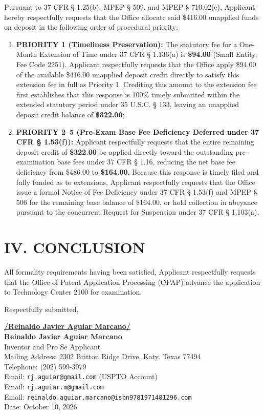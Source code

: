 \documentclass[11pt,letterpaper]{article}
\begin{document}
Pursuant to 37 CFR \S{} 1.25(b), MPEP \S{} 509, and MPEP \S{} 710.02(e), Applicant hereby respectfully requests that the Office allocate said \$416.00 unapplied funds on deposit in the following order of procedural priority:
\begin{enumerate}[leftmargin=*]
    \item \textbf{PRIORITY 1 (Timeliness Preservation):} The statutory fee for a One-Month Extension of Time under 37 CFR \S{} 1.136(a) is \textbf{\$94.00} (Small Entity, Fee Code 2251). Applicant respectfully requests that the Office apply \$94.00 of the available \$416.00 unapplied deposit credit directly to satisfy this extension fee in full as Priority 1. Crediting this amount to the extension fee first establishes that this response is 100\% timely submitted within the extended statutory period under 35 U.S.C. \S{} 133, leaving an unapplied deposit credit balance of \textbf{\$322.00};
    \item \textbf{PRIORITY 2--5 (Pre-Exam Base Fee Deficiency Deferred under 37 CFR \S{} 1.53(f)):} Applicant respectfully requests that the entire remaining deposit credit of \textbf{\$322.00} be applied directly toward the outstanding pre-examination base fees under 37 CFR \S{} 1.16, reducing the net base fee deficiency from \$486.00 to \textbf{\$164.00}. Because this response is timely filed and fully funded as to extensions, Applicant respectfully requests that the Office issue a formal Notice of Fee Deficiency under 37 CFR \S{} 1.53(f) and MPEP \S{} 506 for the remaining base balance of \$164.00, or hold collection in abeyance pursuant to the concurrent Request for Suspension under 37 CFR \S{} 1.103(a).
\end{enumerate}

\section*{IV. CONCLUSION}

All formality requirements having been satisfied, Applicant respectfully requests that the Office of Patent Application Processing (OPAP) advance the application to Technology Center 2100 for examination.

\vspace{0.6cm}
\begin{singlespace}
\noindent Respectfully submitted, \par\vspace{0.8cm}
\underline{\textbf{/Reinaldo Javier Aguiar Marcano/}} \\
\textbf{Reinaldo Javier Aguiar Marcano} \\
Inventor and Pro Se Applicant \\
Mailing Address: 2302 Britton Ridge Drive, Katy, Texas 77494 \\
Telephone: (202) 599-3979 \\
Email: \texttt{rj.aguiar@gmail.com} (USPTO Account) \\
Email: \texttt{rj.aguiar.m@gmail.com} \\
Email: \texttt{reinaldo.aguiar.marcano@isbn9781971481296.com} \\
Date: October 10, 2026
\end{singlespace}
\end{document}
